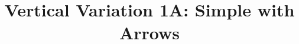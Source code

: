 \documentclass[11pt]{article}
\begin{document}
\title{Vertical Variation 1A: Simple with Arrows}
\date{}
\maketitle

\end{document}
